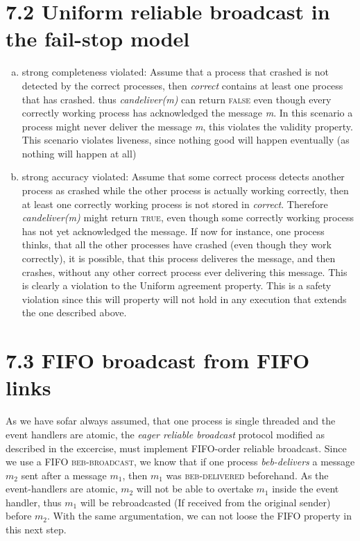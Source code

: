 \documentclass{article}
\begin{document}
    \section*{7.2 Uniform reliable broadcast in the fail-stop model}
    \begin{enumerate}[a)]
        \item strong completeness violated: Assume that a process that crashed is not detected by the correct processes,
        then \textit{correct} contains at least one process that has crashed.
        thus \textit{candeliver(m)} can return \textsc{false} even though every correctly working process has acknowledged the message \textit{m}.
        In this scenario a process might never deliver the message \textit{m}, this violates the validity property. This scenario violates liveness, since nothing good will happen eventually (as nothing will happen at all)
        
        \item strong accuracy violated: Assume that some correct process detects another process as crashed while the other process is actually working correctly,
        then at least one correctly working process is not stored in \textit{correct}.
        Therefore \textit{candeliver(m)} might return \textsc{true}, even though some correctly working process has not yet acknowledged the message.
        If now for instance, one process thinks, that all the other processes have crashed (even though they work correctly), it is possible, that this process deliveres the message, and then crashes, without any other correct process ever delivering this message.
        This is clearly a violation to the Uniform agreement property. This is a safety violation since this will property will not hold in any execution that extends the one described above.
    \end{enumerate}

    \newpage
    
    \section*{7.3 FIFO broadcast from FIFO links}
    As we have sofar always assumed, that one process is single threaded and the event handlers are atomic, the \textit{eager reliable broadcast} protocol modified as described in the excercise,
    must implement FIFO-order reliable broadcast.
    Since we use a FIFO \textsc{beb-broadcast}, we know that if one process \textit{beb-delivers} a message $m_2$ sent after a message $m_1$, then $m_1$ was \textsc{beb-delivered} beforehand.
    As the event-handlers are atomic, $m_2$ will not be able to overtake $m_1$ inside the event handler, thus $m_1$ will be rebroadcasted (If received from the original sender) before $m_2$.
    With the same argumentation, we can not loose the FIFO property in this next step. 
\end{document}
